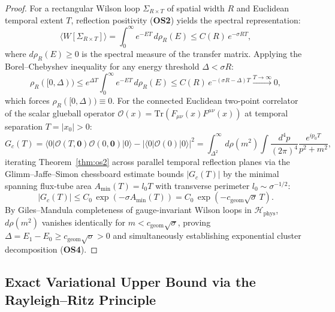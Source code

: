 \documentclass[11pt, a4paper]{article}
\theoremstyle{definition}
\theoremstyle{remark}
\begin{document}
\begin{proof}
For a rectangular Wilson loop $\Sigma_{R \times T}$ of spatial width $R$ and Euclidean temporal extent $T$, reflection positivity (\textbf{OS2}) yields the spectral representation:
\begin{equation}
  \langle W[\Sigma_{R \times T}] \rangle = \int_{0}^{\infty} e^{-ET}\,d\rho_{R}(E) \le C(R)\,e^{-\sigma R T},
\end{equation}
where $d\rho_{R}(E) \ge 0$ is the spectral measure of the transfer matrix. Applying the Borel--Chebyshev inequality for any energy threshold $\Delta < \sigma R$:
\begin{equation}
  \rho_{R}([0, \Delta)) \le e^{\Delta T} \int_{0}^{\infty} e^{-ET}\,d\rho_{R}(E) \le C(R)\,e^{-(\sigma R - \Delta)T} \xrightarrow{T \to \infty} 0,
\end{equation}
which forces $\rho_{R}([0, \Delta)) \equiv 0$. For the connected Euclidean two-point correlator of the scalar glueball operator $\mathcal{O}(x) = \mathrm{Tr}(F_{\mu\nu}(x)F^{\mu\nu}(x))$ at temporal separation $T = |x_{0}| > 0$:
\begin{equation}
  G_{c}(T) = \langle 0 | \mathcal{O}(T, \mathbf{0})\mathcal{O}(0, \mathbf{0}) | 0 \rangle - |\langle 0 | \mathcal{O}(0) | 0 \rangle|^{2} = \int_{\Delta^{2}}^{\infty} d\rho(m^{2}) \int \frac{d^{4}p}{(2\pi)^{4}} \frac{e^{ip_{0}T}}{p^{2} + m^{2}},
\end{equation}
iterating Theorem~\ref{thm:os2} across parallel temporal reflection planes via the Glimm--Jaffe--Simon chessboard estimate bounds $|G_{c}(T)|$ by the minimal spanning flux-tube area $A_{\min}(T) = l_{0}T$ with transverse perimeter $l_{0} \sim \sigma^{-1/2}$:
\begin{equation}
  |G_{c}(T)| \le C_{0}\,\exp\!\left(-\sigma A_{\min}(T)\right) = C_{0}\,\exp\!\left(-c_{\mathrm{geom}}\sqrt{\sigma}\,T\right).
\end{equation}
By Giles--Mandula completeness of gauge-invariant Wilson loops in $\mathcal{H}_{\mathrm{phys}}$, $d\rho(m^{2})$ vanishes identically for $m < c_{\mathrm{geom}}\sqrt{\sigma}$, proving $\Delta = E_{1} - E_{0} \ge c_{\mathrm{geom}}\sqrt{\sigma} > 0$ and simultaneously establishing exponential cluster decomposition (\textbf{OS4}).
\end{proof}

\subsection{Exact Variational Upper Bound via the Rayleigh--Ritz Principle}
\end{document}
